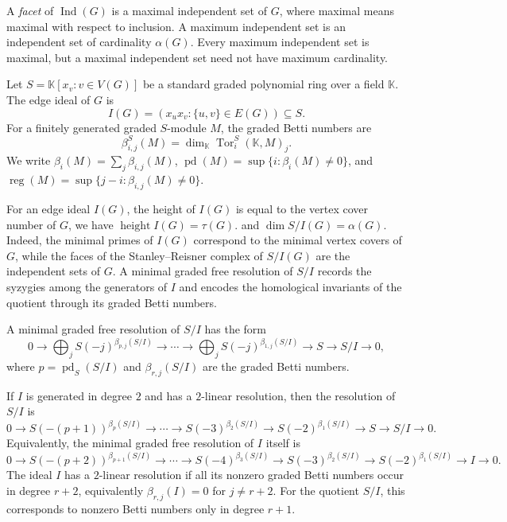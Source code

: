 \documentclass[12pt]{article}
\theoremstyle{definition}
\begin{document}
A \emph{facet} of $\operatorname{Ind}(G)$ is a maximal independent set of $G$,
where maximal means maximal with respect to inclusion. A maximum independent set
is an independent set of cardinality $\alpha(G)$. Every maximum independent set
is maximal, but a maximal independent set need not have maximum cardinality.







\medskip

Let $S=\mathbb{K}[x_v:v\in V(G)]$ be a standard graded polynomial ring over a field $\mathbb{K}$.  The edge ideal of $G$ is
$$
I(G)=(x_u x_v:\{u,v\}\in E(G))\subseteq S.
$$
For a finitely generated graded $S$-module $M$, the graded Betti numbers are
$$
\beta_{i,j}^{S}(M)=\dim_{\mathbb{K}}\operatorname{Tor}_i^S(\mathbb{K},M)_j.
$$
We write $\beta_i(M)=\sum_j\beta_{i,j}(M)$, $\operatorname{pd}(M)=\sup\{i:\beta_i(M)\neq 0\}$, and $\operatorname{reg}(M)=\sup\{j-i:\beta_{i,j}(M)\neq 0\}$.


For an edge ideal $I(G)$, the height of $I(G)$ is equal to the vertex cover
number of $G$, we have 
$
\operatorname{height} I(G)=\tau(G).
$
 and $
\dim S/I(G)=\alpha(G).
$
Indeed, the minimal primes of $I(G)$ correspond to the minimal vertex covers of
$G$, while the faces of the Stanley--Reisner complex of $S/I(G)$ are the
independent sets of $G$.
\medskip
A minimal graded free resolution of $S/I$ records the syzygies among the generators of $I$ and encodes the homological invariants of the quotient through its graded Betti numbers.


A minimal graded free resolution of $S/I$ has the form
$$
0\longrightarrow
\bigoplus_j S(-j)^{\beta_{p,j}(S/I)}
\longrightarrow
\cdots
\longrightarrow
\bigoplus_j S(-j)^{\beta_{1,j}(S/I)}
\longrightarrow
S
\longrightarrow
S/I
\longrightarrow 0,
$$
where $p=\operatorname{pd}_S(S/I)$ and $\beta_{r,j}(S/I)$ are the graded Betti numbers.

\medskip

If $I$ is generated in degree $2$ and has a $2$-linear resolution, then the resolution of $S/I$ is
$$
0\longrightarrow
S(-(p+1))^{\beta_p(S/I)}
\longrightarrow
\cdots
\longrightarrow
S(-3)^{\beta_2(S/I)}
\longrightarrow
S(-2)^{\beta_1(S/I)}
\longrightarrow
S
\longrightarrow
S/I
\longrightarrow 0.
$$
Equivalently, the minimal graded free resolution of $I$ itself is
{\footnotesize $$
0\longrightarrow
S(-(p+2))^{\beta_{p+1}(S/I)}
\longrightarrow
\cdots
\longrightarrow
S(-4)^{\beta_3(S/I)}
\longrightarrow
S(-3)^{\beta_2(S/I)}
\longrightarrow
S(-2)^{\beta_1(S/I)}
\longrightarrow
I
\longrightarrow 0.
$$} 
The ideal $I$ has a $2$-linear resolution if all its nonzero graded Betti numbers occur in degree $r+2$, equivalently $\beta_{r,j}(I)=0$ for $j\ne r+2$. For the quotient $S/I$, this corresponds to nonzero Betti numbers only in degree $r+1$.
\medskip
\end{document}
